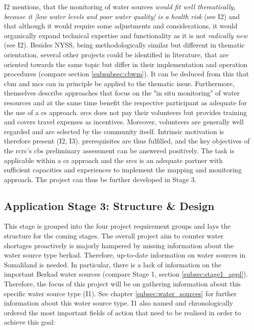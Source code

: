 I2 mentions, that the monitoring of water sources \textit{would fit well thematically, because it [low water levels and poor water quality] is a health risk} (see I2) and that although it would require some adjustments and considerations, it would organically expand technical expertise and functionality as it is not \textit{radically new} (see I2). Besides NYSS, being methodologically similar but different in thematic orientation, several other projects could be identified in literature, that are oriented towards the same topic but differ in their implementation and operation procedures (compare section \ref{subsubsec:cbwm}). It can be deduced from this that \acrshort{cbm} and \acrshort{mcs} can in principle be applied to the thematic issue. Furthermore, \textcite{fraislCitizenScienceEnvironmental2022} themselves describe approaches that focus on the "in situ monitoring" of water resources and at the same time benefit the respective participant as adequate for the use of a \acrlong{cs} approach. \acrshort{srcs} does not pay their volunteers but provides training and covers travel expenses as incentives. Moreover, volunteers are generally well regarded and are selected by the community itself. Intrinsic motivation is therefore present (I2, I3).\newline
\autocite{fraislCitizenScienceEnvironmental2022} prerequisites are thus fulfilled, and the key objectives of the \acrshort{rcrc}'s \acrshort{cbs} preliminary assessment can be answered positively. The task is applicable within a \acrshort{cs} approach and the \acrshort{srcs} is an adequate partner with sufficient capacities and experiences to implement the mapping and monitoring approach. The project can thus be further developed in Stage 3.

\subsection{Application Stage 3: Structure \& Design}\label{subsec:stage3_appl}

This stage is grouped into the four project requirement groups and lays the structure for the coming stages. The overall project aim to counter water shortages proactively is majorly hampered by missing information about the water source type berkad. Therefore, up-to-date information on water sources in Somaliland is needed. In particular, there is a lack of information on the important Berkad water sources (compare Stage 1, section \ref{subsec:stage1_appl}). Therefore, the focus of this project will be on gathering information about this specific water source type (I1). See chapter \ref{subsec:water_sources} for further information about this water source type. I1 also named and chronologically ordered the most important fields of action that need to be realised in order to achieve this goal:


